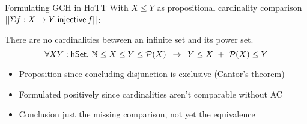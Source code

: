 \documentclass[xcolor=dvipsnames,compress,aspectratio=169,handout]{beamer}
\newcommand{\MBB}[1]{\ensuremath{\mathbb{#1}}\xspace}  %
\newcommand{\MCL}[1]{\ensuremath{\mathcal{#1}}\xspace} %
\newcommand{\Nat}{\MBB{N}}   %
\newcommand{\Pow}{\MCL P}
\begin{document}
\begin{frame}{Formulating GCH in HoTT}
	With $X\le Y$ as propositional cardinality comparison $||\Sigma f:X\to Y.\,\mathsf{injective}\,f||$:
	
	\vspace{0.5cm}
	\begin{centering}
		\begin{widerbox}
			\center
			There are no cardinalities between an infinite set and its power set.
			$$\forall X Y:\hset.~\Nat \le X\le Y\le \Pow(X)~\,\to~\, Y\le X ~+~ \Pow(X)\le Y$$
		\end{widerbox}
	\end{centering}
	
	\vspace{0.5cm}
	\begin{itemize}
		\item
		Proposition since concluding disjunction is exclusive (Cantor's theorem)
		\vspace{0.3cm}
		\item
		Formulated positively since cardinalities aren't comparable without AC
		\vspace{0.3cm}
		\item
		Conclusion just the missing comparison, not yet the equivalence
	\end{itemize}
\end{frame}
\end{document}
